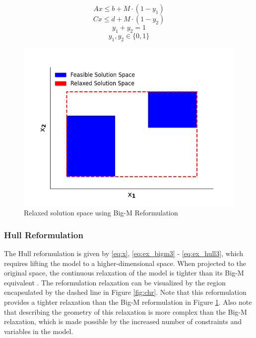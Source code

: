 \documentclass{juliacon}
\begin{document}
\begin{equation}
    \label{eq:ex_bigm1}
    Ax \leq b + M \cdot (1 - y_1)
\end{equation}
\begin{equation}
    \label{eq:ex_bigm2}
    Cx \leq d + M \cdot (1 - y_2)
\end{equation}
\begin{equation}
    \label{eq:ex_bigm3}
    y_1 + y_2 = 1
\end{equation}
\begin{equation}
    \label{eq:ex_bigm4}
    y_1, y_2 \in \{0,1\}
\end{equation}

\begin{figure}
    \centering
    \includegraphics[scale=0.5]{bigm.png}
    \caption{Relaxed solution space using Big-M Reformulation}
    \label{fig:bigm}
\end{figure}

\subsubsection{Hull Reformulation}
The Hull reformulation is given by \eqref{eq:x}, \eqref{eq:ex_bigm3} - \eqref{eq:ex_hull3}, which requires lifting the model to a higher-dimensional space. When projected to the original space, the continuous relaxation of the model is tighter than its Big-M equivalent \cite{grossmann_trespalacios_2013}. The reformulation relaxation can be visualized by the region encapsulated by the dashed line in Figure \ref{fig:chr}. Note that this reformulation provides a tighter relaxation than the Big-M reformulation in Figure \ref{fig:bigm}. Also note that describing the geometry of this relaxation is more complex than the Big-M relaxation, which is made possible by the increased number of constraints and variables in the model.
\end{document}

